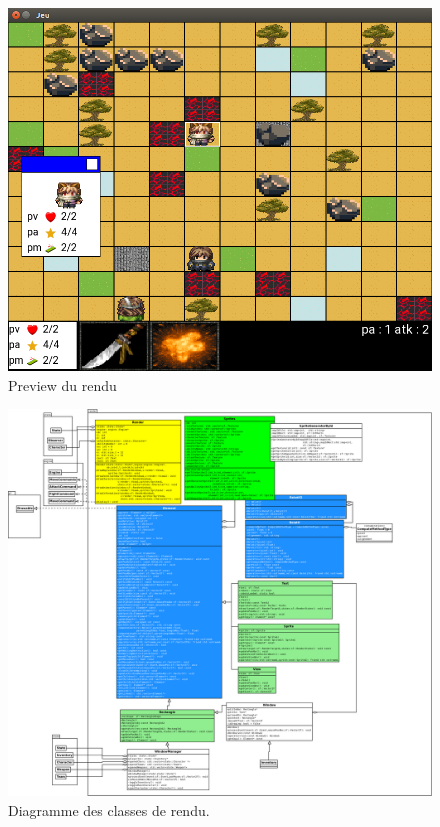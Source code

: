 \documentclass[a4paper,12pt]{article}
\begin{document}
\begin{figure}[p]
    \centering
    \includegraphics[width=\textwidth]{render_preview.png}
    \caption{Preview du rendu}
\end{figure}

\newpage
\begin{figure}[p]
    \centering
    \includegraphics[width=\textwidth,height=\textheight,keepaspectratio]{render.png}
    \caption{\label{uml:render}Diagramme des classes de rendu.}
\end{figure}
\end{document}
